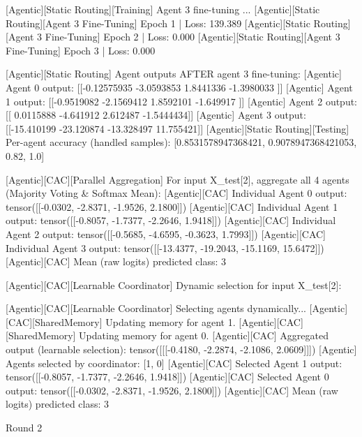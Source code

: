 [Agentic][Static Routing][Training] Agent 3 fine-tuning ...
[Agentic][Static Routing][Agent 3 Fine-Tuning] Epoch 1 | Loss: 139.389
[Agentic][Static Routing][Agent 3 Fine-Tuning] Epoch 2 | Loss: 0.000
[Agentic][Static Routing][Agent 3 Fine-Tuning] Epoch 3 | Loss: 0.000

[Agentic][Static Routing] Agent outputs AFTER agent 3 fine-tuning:
[Agentic] Agent 0 output: [[-0.12575935 -3.0593853   1.8441336  -1.3980033 ]]
[Agentic] Agent 1 output: [[-0.9519082 -2.1569412  1.8592101 -1.649917 ]]
[Agentic] Agent 2 output: [[ 0.0115888 -4.641912   2.612487  -1.5444434]]
[Agentic] Agent 3 output: [[-15.410199 -23.120874 -13.328497  11.755421]]
[Agentic][Static Routing][Testing] Per-agent accuracy (handled samples): [0.8531578947368421, 0.9078947368421053, 0.82, 1.0]

[Agentic][CAC][Parallel Aggregation] For input X_test[2], aggregate all 4 agents (Majority Voting & Softmax Mean):
[Agentic][CAC] Individual Agent 0 output: tensor([[-0.0302, -2.8371, -1.9526,  2.1800]])
[Agentic][CAC] Individual Agent 1 output: tensor([[-0.8057, -1.7377, -2.2646,  1.9418]])
[Agentic][CAC] Individual Agent 2 output: tensor([[-0.5685, -4.6595, -0.3623,  1.7993]])
[Agentic][CAC] Individual Agent 3 output: tensor([[-13.4377, -19.2043, -15.1169,  15.6472]])
[Agentic][CAC] Mean (raw logits) predicted class: 3

[Agentic][CAC][Learnable Coordinator] Dynamic selection for input X_test[2]:

[Agentic][CAC][Learnable Coordinator] Selecting agents dynamically...
[Agentic][CAC][SharedMemory] Updating memory for agent 1.
[Agentic][CAC][SharedMemory] Updating memory for agent 0.
[Agentic][CAC] Aggregated output (learnable selection): tensor([[[-0.4180, -2.2874, -2.1086,  2.0609]]])
[Agentic] Agents selected by coordinator: [1, 0]
[Agentic][CAC] Selected Agent 1 output: tensor([[-0.8057, -1.7377, -2.2646,  1.9418]])
[Agentic][CAC] Selected Agent 0 output: tensor([[-0.0302, -2.8371, -1.9526,  2.1800]])
[Agentic][CAC] Mean (raw logits) predicted class: 3

Round 2

